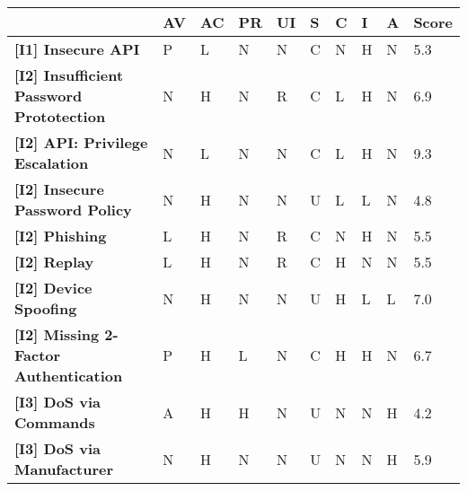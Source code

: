 \begin{sidewaystable}
\centering
\sffamily
\begin{tabularx}{\textwidth}{|l|X|X|X|X|X|X|X|X|l|}
\hline
                                                     & \textbf{AV} & \textbf{AC} & \textbf{PR} & \textbf{UI} & \textbf{S} & \textbf{C} & \textbf{I} & \textbf{A} & \textbf{Score} \\ \hline
\textbf{{[}I1{]} Insecure API}                       & P           & L           & N           & N           & C          & N          & H          & N          & 5.3            \\ \hline
\textbf{{[}I2{]} Insufficient Password Prototection} & N           & H           & N           & R           & C          & L          & H          & N          & 6.9            \\ \hline
\textbf{{[}I2{]} API: Privilege Escalation}          & N           & L           & N           & N           & C          & L          & H          & N          & 9.3            \\ \hline
\textbf{{[}I2{]} Insecure Password Policy}           & N           & H           & N           & N           & U          & L          & L          & N          & 4.8            \\ \hline
\textbf{{[}I2{]} Phishing}                           & L           & H           & N           & R           & C          & N          & H          & N          & 5.5            \\ \hline
\textbf{{[}I2{]} Replay}                             & L           & H           & N           & R           & C          & H          & N          & N          & 5.5            \\ \hline
\textbf{{[}I2{]} Device Spoofing}                    & N           & H           & N           & N           & U          & H          & L          & L          & 7.0            \\ \hline
\textbf{{[}I2{]} Missing 2-Factor Authentication}    & P           & H           & L           & N           & C          & H          & H          & N          & 6.7            \\ \hline
\textbf{{[}I3{]} DoS via Commands}                   & A           & H           & H           & N           & U          & N          & N          & H          & 4.2            \\ \hline
\textbf{{[}I3{]} DoS via Manufacturer}               & N           & H           & N           & N           & U          & N          & N          & H          & 5.9            \\ \hline

\end{tabularx}
\end{sidewaystable}

